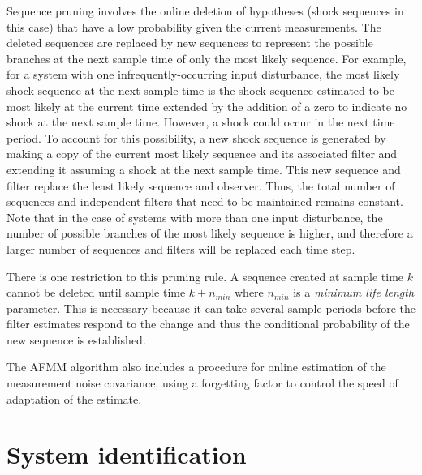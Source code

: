 Sequence pruning involves the online deletion of hypotheses (shock sequences in this case) that have a low probability given the current measurements. The deleted sequences are replaced by new sequences to represent the possible branches at the next sample time of only the most likely sequence. For example, for a system with one infrequently-occurring input disturbance, the most likely shock sequence at the next sample time is the shock sequence estimated to be most likely at the current time extended by the addition of a zero to indicate no shock at the next sample time. However, a shock could occur in the next time period. To account for this possibility, a new shock sequence is generated by making a copy of the current most likely sequence and its associated filter and extending it assuming a shock at the next sample time. This new sequence and filter replace the least likely sequence and observer. Thus, the total number of sequences and independent filters that need to be maintained remains constant. Note that in the case of systems with more than one input disturbance, the number of possible branches of the most likely sequence is higher, and therefore a larger number of sequences and filters will be replaced each time step.

There is one restriction to this pruning rule. A sequence created at sample time $k$ cannot be deleted until sample time $k+n_{min}$ where $n_{min}$ is a \textit{minimum life length} parameter. This is necessary because it can take several sample periods before the filter estimates respond to the change and thus the conditional probability of the new sequence is established.

The AFMM algorithm also includes a procedure for online estimation of the measurement noise covariance, using a forgetting factor to control the speed of adaptation of the estimate.\cite{andersson_adaptive_1985}

\section{System identification}

